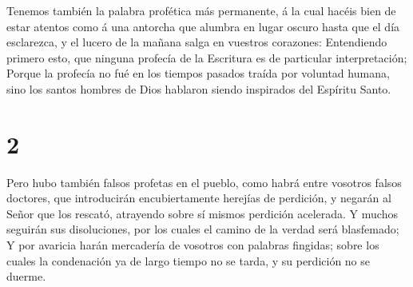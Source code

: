 Tenemos también la palabra profética más permanente, á la
cual hacéis bien de estar atentos como á una antorcha que alumbra en
lugar oscuro hasta que el día esclarezca, y el lucero de la mañana salga
en vuestros corazones:  Entendiendo primero esto, que
ninguna profecía de la Escritura es de particular interpretación;
 Porque la profecía no fué en los tiempos pasados traída
por voluntad humana, sino los santos hombres de Dios hablaron siendo
inspirados del Espíritu Santo.

\hypertarget{section-1}{%
\section{2}\label{section-1}}

 Pero hubo también falsos profetas en el pueblo, como habrá
entre vosotros falsos doctores, que introducirán encubiertamente
herejías de perdición, y negarán al Señor que los rescató, atrayendo
sobre sí mismos perdición acelerada.  Y muchos seguirán sus
disoluciones, por los cuales el camino de la verdad será blasfemado;
 Y por avaricia harán mercadería de vosotros con palabras
fingidas; sobre los cuales la condenación ya de largo tiempo no se
tarda, y su perdición no se duerme.

